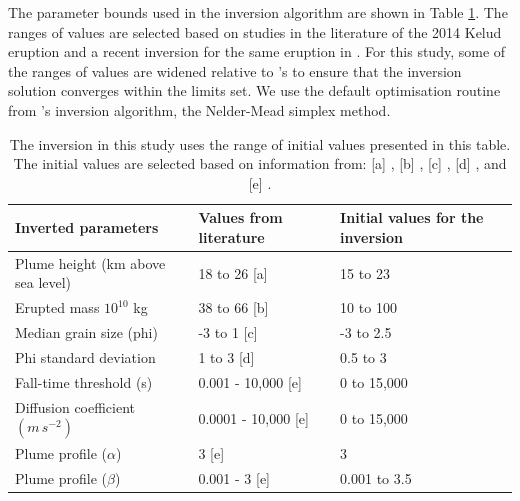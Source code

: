 The parameter bounds used in the inversion algorithm are shown in Table \ref{tab:eps}. The ranges of values are selected based on studies in the literature of the 2014 Kelud eruption and a recent inversion for the same eruption in \cite{williams2020}. For this study, some of the ranges of values are widened relative to \cite{williams2020}'s to ensure that the inversion solution converges within the limits set. We use the default optimisation routine from \citet{connor2006inversion}'s inversion algorithm, the Nelder-Mead simplex method.

    \begin{table}[]
    \caption{The inversion in this study uses the range of initial values presented in this table. The initial values are selected based on information from: [a] \citet{kristiansen2015stratospheric}, [b] \citet{MAENO201924}, [c] \citet{goode2019insights, MAENO201924}, [d] \citet{goode2019insights, MAENO201924}, and [e] \citet{williams2020}.}
    \label{tab:eps}
    \begin{tabular}{@{}lll@{}}
    \toprule
    Inverted parameters         & 
    Values from literature &
    Initial values for the inversion
     \\ 
    \midrule
    
    Plume height (km above sea level)           &
    18 to 26 [a] &
    15 to 23 
                   \\
    
    Erupted mass $10^{10}$ kg          &
    38 to 66 [b] &
    10 to 100   
                  \\
    
    Median grain size (phi)            & 
    -3 to 1 [c]   &
    -3 to 2.5   
                \\
    
    Phi standard deviation             & 
    1 to 3 [d] &
    0.5 to 3                          
                  \\
    
    Fall-time threshold (s)            & 
    0.001 - 10,000 [e]  &
    0 to 15,000                       
           \\
    
    Diffusion coefficient $(m\,s^{-2})$ & 
    0.0001 - 10,000 [e]  &
    0 to 15,000                       
           \\
    
    Plume profile ($\alpha$)           & 
    3 [e] &
    3                                
            \\
    
    Plume profile ($\beta$)            & 
    0.001 - 3 [e]  &
    0.001 to 3.5                      
           \\ \bottomrule
    \end{tabular}
    \end{table}

